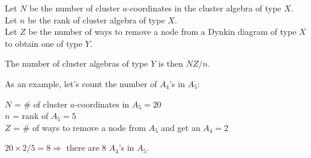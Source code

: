 \documentclass[12pt]{article}
\begin{document}
Let \(N\) be the number of cluster \(a\)-coordinates in the cluster algebra of type \(X\).\\
Let \(n\) be the rank of cluster algebra of type \(X\).\\
Let \(Z\) be the number of ways to remove a node from a Dynkin diagram of type \(X\) to obtain one of type \(Y\).

The number of cluster algebras of type \(Y\) is then \(NZ/n\).

As an example, let's count the number of \(A_4\)'s in \(A_5\):

\(N\) = \# of cluster \(a\)-coordinates in \(A_5 = 20\)\\
\(n\) = rank of \(A_5 = 5\)\\
\(Z\) = \# of ways to remove a node from \(A_5\) and get an \(A_4 = 2\)

\(20\times2/5 = 8 \Rightarrow\) there are 8 \(A_4\)'s in \(A_5\).
\end{document}

